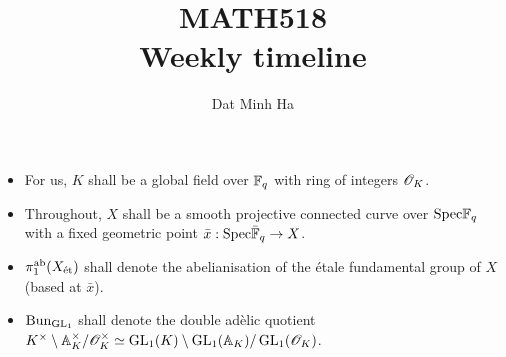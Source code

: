 
\usepackage{soul}





	\title{MATH518\\Weekly timeline}
	
	\author{Dat Minh Ha}
	\maketitle
	
	\begin{convention}
	    \noindent
	    \begin{itemize}
	        \item For us, $K$ shall be a global field over $\mathbb{F}_q$ with ring of integers $\mathscr{O}_K$.
	        \item Throughout, $X$ shall be a smooth projective connected curve over $\mathrm{Spec} \mathbb{F}_q$ with a fixed geometric point $\bar{x}: \mathrm{Spec} \bar{\mathbb{F}}_q \to X$.
	        \item $\pi_1^{\mathrm{ab}}(X_{\mathrm{\acute{e}t}})$ shall denote the abelianisation of the \'etale fundamental group of $X$ (based at $\bar{x}$).
	        \item $\mathrm{Bun}_{\operatorname{GL}_1}$ shall denote the double ad\`elic quotient $K^{\x}\setminus\A_K^{\x}/\scrO_K^{\x} \cong \GL_1(K)\setminus\GL_1(\A_K)/\GL_1(\scrO_K)$.
	    \end{itemize}
	\end{convention}
	
